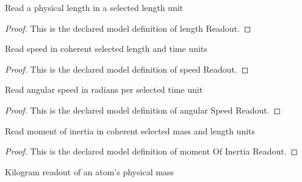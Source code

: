 \begin{definition}
  \label{def:physics:phyx-mini-0335:phyxminiproblems-problemphyxmini0335-lengthreadout}
  Read a physical length in a selected length unit
\end{definition}
\begin{proof}
  This is the declared model definition of length Readout.
\end{proof}
\begin{definition}
  \label{def:physics:phyx-mini-0335:phyxminiproblems-problemphyxmini0335-speedreadout}
  Read speed in coherent selected length and time units
\end{definition}
\begin{proof}
  This is the declared model definition of speed Readout.
\end{proof}
\begin{definition}
  \label{def:physics:phyx-mini-0335:phyxminiproblems-problemphyxmini0335-angularspeedreadout}
  Read angular speed in radians per selected time unit
\end{definition}
\begin{proof}
  This is the declared model definition of angular Speed Readout.
\end{proof}
\begin{definition}
  \label{def:physics:phyx-mini-0335:phyxminiproblems-problemphyxmini0335-momentofinertiareadout}
  Read moment of inertia in coherent selected mass and length units
\end{definition}
\begin{proof}
  This is the declared model definition of moment Of Inertia Readout.
\end{proof}
\begin{definition}
  \label{def:physics:phyx-mini-0335:phyxminiproblems-problemphyxmini0335-massinkilograms}
  Kilogram readout of an atom's physical mass
\end{definition}
